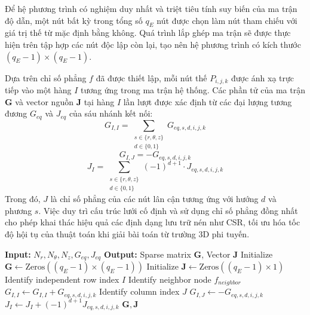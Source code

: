 Để hệ phương trình có nghiệm duy nhất và triệt tiêu tính suy biến của ma trận độ dẫn, một nút bất kỳ trong tổng số $q_E$ nút được chọn làm nút tham chiếu với giá trị thế từ mặc định bằng không. Quá trình lắp ghép ma trận sẽ được thực hiện trên tập hợp các nút độc lập còn lại, tạo nên hệ phương trình có kích thước $(q_E - 1) \times (q_E - 1)$.

Dựa trên chỉ số phẳng $f$ đã được thiết lập, mỗi nút thế $P_{i,j,k}$ được ánh xạ trực tiếp vào một hàng $I$ tương ứng trong ma trận hệ thống. Các phần tử của ma trận $\mathbf{G}$ và vector nguồn $\mathbf{J}$ tại hàng $I$ lần lượt được xác định từ các đại lượng tương đương $G_{eq}$ và $J_{eq}$ của sáu nhánh kết nối:
\begin{equation}
    G_{I,I} = \sum_{\substack{s \in \{r, \theta, z\} \\ d \in \{0, 1\}}} G_{eq,s,d,i,j,k}
\end{equation}
\begin{equation}
    G_{I,J} = -G_{eq,s,d,i,j,k}
\end{equation}
\begin{equation}
    J_I = \sum_{\substack{s \in \{r, \theta, z\} \\ d \in \{0, 1\}}} (-1)^{d+1} \cdot J_{eq,s,d,i,j,k}
\end{equation}
Trong đó, $J$ là chỉ số phẳng của các nút lân cận tương ứng với hướng $d$ và phương $s$. Việc duy trì cấu trúc lưới cố định và sử dụng chỉ số phẳng đồng nhất cho phép khai thác hiệu quả các định dạng lưu trữ nén như CSR, tối ưu hóa tốc độ hội tụ của thuật toán khi giải bài toán từ trường 3D phi tuyến.

\begin{algorithm}[H]
\caption{3D-MRN Matrix Assembly Procedure}
\label{alg:assembly}
\begin{algorithmic}[1]
\STATE \textbf{Input:} $N_r, N_\theta, N_z, G_{eq}, J_{eq}$
\STATE \textbf{Output:} Sparse matrix $\mathbf{G}$, Vector $\mathbf{J}$
\STATE Initialize $\mathbf{G} \leftarrow \text{Zeros}((q_E-1) \times (q_E-1))$
\STATE Initialize $\mathbf{J} \leftarrow \text{Zeros}((q_E-1) \times 1)$
        \STATE Identify independent row index $I$
            \STATE Identify neighbor node $f_{neighbor}$
            \STATE $G_{I,I} \leftarrow G_{I,I} + G_{eq,s,d,i,j,k}$
                \STATE Identify column index $J$
                \STATE $G_{I,J} \leftarrow -G_{eq,s,d,i,j,k}$
            \ENDIF
            \STATE $J_I \leftarrow J_I + (-1)^{d+1} J_{eq,s,d,i,j,k}$
        \ENDFOR
    \ENDIF
\ENDFOR
\STATE \RETURN $\mathbf{G}, \mathbf{J}$
\end{algorithmic}
\end{algorithm}


